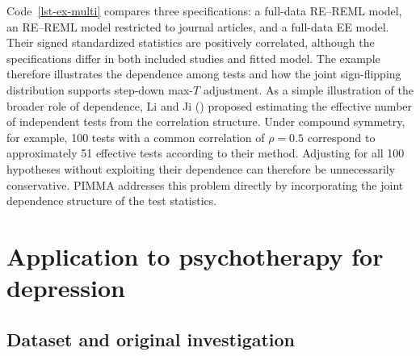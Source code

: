 \documentclass[
  man,
  longtable,
  nolmodern,
  notxfonts,
  notimes,
  colorlinks=true,linkcolor=blue,citecolor=blue,urlcolor=blue]{apa7}
\newenvironment{Shaded}{\begin{snugshade}}{\end{snugshade}}
\newcommand{\CommentTok}[1]{\textcolor[rgb]{0.37,0.37,0.37}{#1}}
\newcommand{\DecValTok}[1]{\textcolor[rgb]{0.68,0.00,0.00}{#1}}
\newcommand{\DocumentationTok}[1]{\textcolor[rgb]{0.37,0.37,0.37}{\textit{#1}}}
\newcommand{\FunctionTok}[1]{\textcolor[rgb]{0.28,0.35,0.67}{#1}}
\newcommand{\NormalTok}[1]{\textcolor[rgb]{0.00,0.23,0.31}{#1}}
\newcommand{\OtherTok}[1]{\textcolor[rgb]{0.00,0.23,0.31}{#1}}
\newcommand{\SpecialCharTok}[1]{\textcolor[rgb]{0.37,0.37,0.37}{#1}}
\begin{document}
%

Code~\ref{lst-ex-multi} compares three specifications: a full-data
RE--REML model, an RE--REML model restricted to journal articles, and a
full-data EE model. Their signed standardized statistics are positively
correlated, although the specifications differ in both included studies
and fitted model. The example therefore illustrates the dependence among
tests and how the joint sign-flipping distribution supports step-down
max-\(T\) adjustment. As a simple illustration of the broader role of
dependence, Li and Ji () proposed
estimating the effective number of independent tests from the
correlation structure. Under compound symmetry, for example, 100 tests
with a common correlation of \(\rho = 0.5\) correspond to approximately
51 effective tests according to their method. Adjusting for all 100
hypotheses without exploiting their dependence can therefore be
unnecessarily conservative. PIMMA addresses this problem directly by
incorporating the joint dependence structure of the test statistics.

\section{Application to psychotherapy for
depression}\label{application-to-psychotherapy-for-depression}

\subsection{Dataset and original
investigation}\label{dataset-and-original-investigation}
\end{document}
